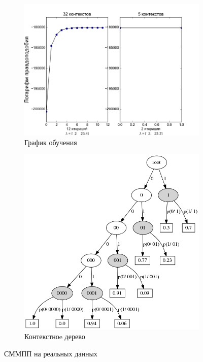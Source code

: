 \documentclass{matmex-diploma-custom}
\begin{document}
\begin{figure}[h!]\centering
\begin{subfigure}[b]{0.49 \textwidth}
	\includegraphics[scale=0.47]{img/real/plot_.png}
	\centering
	\caption{ График обучения }
	\label{fig:log_likelihood}
\end{subfigure}
\hfill
\begin{subfigure}[b]{0.32 \textwidth}
	\includegraphics[scale=0.29]{img/real/predicted_trie.png}
	\centering
	\caption{ Контекстноe дерево }
	\label{fig:real_trie}
\end{subfigure}
\caption{СММПП на реальных данных}
\label{fig:real}
\end{figure}
\end{document}
